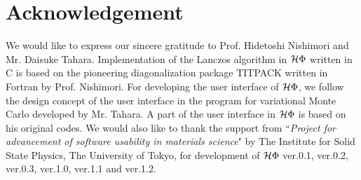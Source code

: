 \chapter{Acknowledgement}
We would like to express our sincere gratitude to Prof. Hidetoshi Nishimori and Mr. Daisuke Tahara.
Implementation of the Lanczos algorithm in $\mathcal{H} \Phi$ written in C is based on the
pioneering diagonalization package TITPACK written in Fortran by Prof. Nishimori.
For developing the user interface of $\mathcal{H} \Phi$, we follow the design concept of
the user interface in the program for variational Monte Carlo developed by Mr. Tahara.
A part of the user interface in $\mathcal{H} \Phi$ is based on his original codes.
We would also like to thank the support from ``{\it Project for advancement of software usability in materials science}" by The Institute for Solid State Physics,
The University of Tokyo, for development of $\mathcal{H} \Phi$ ver.0.1, ver.0.2, ver.0.3, ver.1.0, ver.1.1 and ver.1.2.

